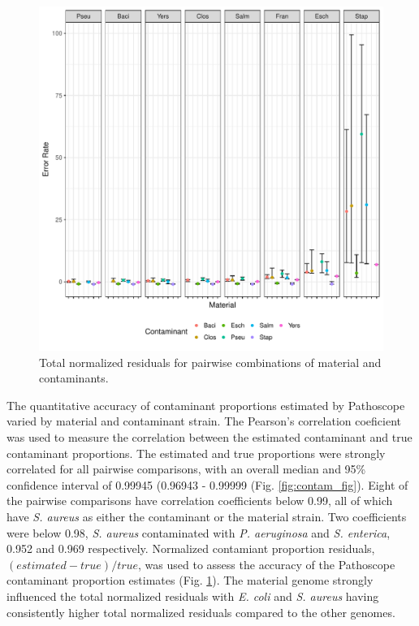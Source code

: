\documentclass[fleqn,10pt,lineno]{wlpeerj}\usepackage[]{graphicx}\usepackage[]{color}
\makeatletter
\def\maxwidth{ %
  \ifdim\Gin@nat@width>\linewidth
    \linewidth
  \else
    \Gin@nat@width
  \fi
}
\newenvironment{knitrout}{}{} %
\makeatother
\begin{document}
\begin{knitrout}
\color{fgcolor}\begin{figure}
\includegraphics[width=\maxwidth]{figure/contam_resid-1.pdf} \caption[Total normalized residuals for pairwise combinations of material and contaminants]{Total normalized residuals for pairwise combinations of material and contaminants.}\label{fig:contam_resid}
\end{figure}


\end{knitrout}

The quantitative accuracy of contaminant proportions estimated by Pathoscope varied by material and contaminant strain.
The Pearson's correlation coeficient was used to measure the correlation between the estimated contaminant and true contaminant proportions. 
The estimated and true proportions were strongly correlated for all pairwise comparisons, with an overall median and 95\% confidence interval of 0.99945 (0.96943 - 0.99999 (Fig. \ref{fig:contam_fig}). 
Eight of the pairwise comparisons have correlation coefficients below 0.99, all of which have \textit{S. aureus} as either the contaminant or the material strain. 
Two coefficients were below 0.98, \textit{S. aureus} contaminated with \textit{P. aeruginosa} and \textit{S. enterica}, 0.952 and 0.969 respectively. 
Normalized contamiant proportion residuals, $(estimated-true)/true$, was used to assess the accuracy of the Pathoscope contaminant proportion estimates (Fig. \ref{fig:contam_resid}). 
The material genome strongly influenced the total normalized residuals with \textit{E. coli} and \textit{S. aureus} having consistently higher total normalized residuals compared to the other genomes. 
\end{document}
